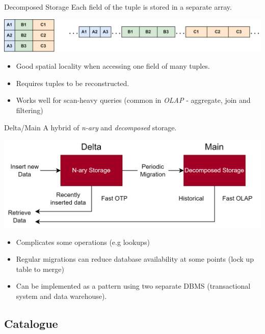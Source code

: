 \begin{definitionbox}{Decomposed Storage}
    Each field of the tuple is stored in a separate array.
    \begin{center}
        \includegraphics[width=.8\textwidth]{storage/images/decomposed_layout.drawio.png}
    \end{center}
    \begin{itemize}
        \item Good spatial locality when accessing one field of many tuples.
        \item Requires tuples to be reconstructed.
        \item Works well for scan-heavy queries (common in \textit{OLAP} - aggregate, join and filtering)
    \end{itemize}
\end{definitionbox}

\begin{definitionbox}{Delta/Main}
    A hybrid of \textit{n-ary} and \textit{decomposed} storage.
    \begin{center}
        \includegraphics[width=.8\textwidth]{storage/images/delta_main.drawio.png}
    \end{center}
    \begin{itemize}
        \item Complicates some operations (e.g lookups)
        \item Regular migrations can reduce database availability at some points (lock up table to merge)
        \item Can be implemented as a pattern using two separate DBMS (transactional system and data warehouse).
    \end{itemize}
\end{definitionbox}

    
\subsection{Catalogue}

